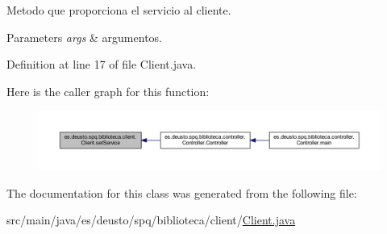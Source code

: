 Metodo que proporciona el servicio al cliente. 
\begin{DoxyParams}{Parameters}
{\em args} & argumentos. \\
\hline
\end{DoxyParams}


Definition at line 17 of file Client.\+java.

Here is the caller graph for this function\+:
\nopagebreak
\begin{figure}[H]
\begin{center}
\leavevmode
\includegraphics[width=350pt]{classes_1_1deusto_1_1spq_1_1biblioteca_1_1client_1_1_client_a96d3aee6ac3ad17ea896e4c50115bdf6_icgraph}
\end{center}
\end{figure}


The documentation for this class was generated from the following file\+:\begin{DoxyCompactItemize}
\item 
src/main/java/es/deusto/spq/biblioteca/client/\mbox{\hyperlink{_client_8java}{Client.\+java}}\end{DoxyCompactItemize}
